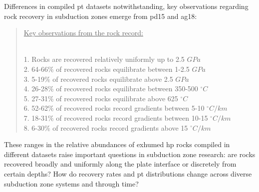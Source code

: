 Differences in compiled \gls{pt} datasets notwithstanding, key observations regarding rock recovery in subduction zones emerge from pd15 and ag18:

\begin{quote}
\uline{Key observations from the rock record:}\\
\strut \\
\hspace*{0.333em}1. Rocks are recovered relatively uniformly up to 2.5 \(GPa\)\\
\hspace*{0.333em}2. 64-66\% of recovered rocks equilibrate between 1-2.5 \(GPa\)\\
\hspace*{0.333em}3. 5-19\% of recovered rocks equilibrate above 2.5 \(GPa\)\\
\hspace*{0.333em}4. 26-28\% of recovered rocks equilibrate between 350-500 \(^\circ C\)\\
\hspace*{0.333em}5. 27-31\% of recovered rocks equilibrate above 625 \(^\circ C\)\\
\hspace*{0.333em}6. 52-62\% of recovered rocks record gradients between 5-10 \(^\circ C/km\)\\
\hspace*{0.333em}7. 18-31\% of recovered rocks record gradients between 10-15 \(^\circ C/km\)\\
\hspace*{0.333em}8. 6-30\% of recovered rocks record gradients above 15 \(^\circ C/km\)
\end{quote}

\noindent These ranges in the relative abundances of exhumed \gls{hp} rocks compiled in different datasets raise important questions in subduction zone research: are rocks recovered broadly and uniformly along the plate interface or discretely from certain depths? How do recovery rates and \gls{pt} distributions change across diverse subduction zone systems and through time?

